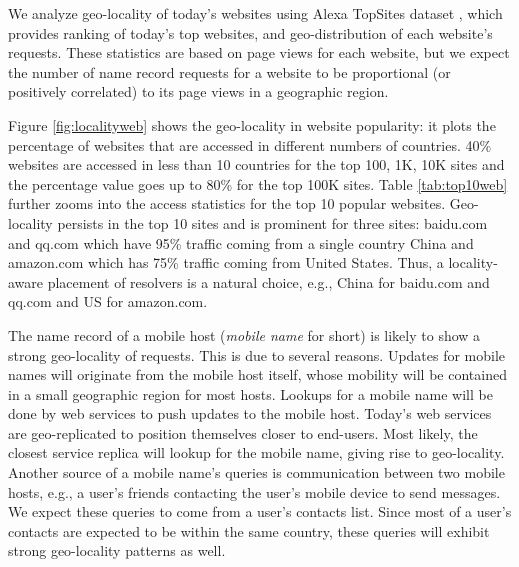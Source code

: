  
We analyze geo-locality of today's websites using Alexa TopSites dataset  \cite{alexa}, which provides ranking of today's top websites, and geo-distribution  of  each website's requests. These statistics are based on page views for each website, but we expect the number of name record requests for a website to be proportional  (or positively correlated) to its page views in a geographic region. 


Figure \ref{fig:localityweb} shows the geo-locality in website popularity: it plots the percentage of websites that are accessed in different numbers of countries. 40\% websites are accessed in less than 10 countries for the top 100, 1K, 10K sites and the percentage value goes up to 80\% for the top 100K sites.  Table \ref{tab:top10web} further zooms into the access statistics for the top 10 popular websites. Geo-locality persists in the top 10 sites and is prominent for three sites: baidu.com and qq.com which have 95\% traffic coming from a single country China and amazon.com which has 75\% traffic coming from United States.
Thus, a locality-aware placement of resolvers is a natural choice, e.g., China for baidu.com and qq.com and US for amazon.com.

The name record of a mobile host (\emph{mobile name} for short) is likely to show a strong geo-locality of requests. This is due to several reasons.
Updates for mobile names will originate from the mobile host itself, whose mobility will be contained in a small geographic region for most hosts.
Lookups for a mobile name will be done by web services to push updates to the mobile host. Today's web services are geo-replicated to position themselves closer to end-users. Most likely, the closest service replica will lookup for the mobile name, giving rise to geo-locality.
Another source of a mobile name's queries is communication between two mobile hosts, e.g., a user's friends contacting the user's mobile device to send messages.
We expect these queries to come from a user's contacts list. Since most of a user's contacts are expected to be within  the same country, these  queries will exhibit strong geo-locality patterns as well.


